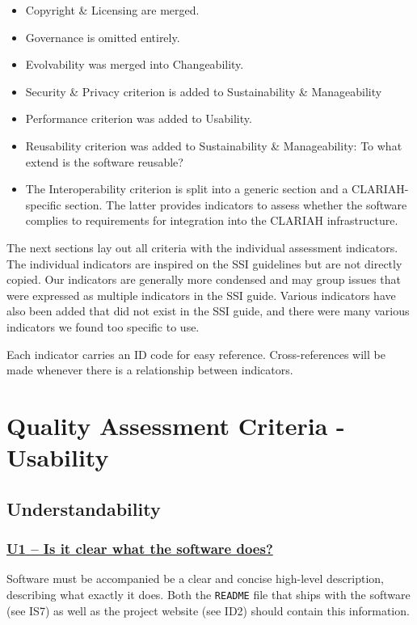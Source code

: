 \documentclass[a4paper,11pt]{article}
\newcommand{\indicator}[1]{\subsubsection*{\underline{#1}}}
\begin{document}
\begin{itemize}
\item Copyright \& Licensing are merged.
\item Governance is omitted entirely. %
\item Evolvability was merged into Changeability.
\item Security \& Privacy criterion is added to Sustainability \& Manageability
\item Performance criterion was added to Usability.
\item Reusability criterion was added to Sustainability \& Manageability: To what extend is the software reusable?
\item The Interoperability criterion is split into a generic section and a CLARIAH-specific section. The latter provides indicators to assess
whether the software complies to requirements for integration into the CLARIAH infrastructure.
\end{itemize}

The next sections lay out all criteria with the individual assessment
indicators. The individual indicators are inspired on the SSI guidelines but
are not directly copied. Our indicators are generally more condensed and may
group issues that were expressed as multiple indicators in the SSI guide.
Various indicators have also been added that did not exist in the SSI guide,
and there were many various indicators we found too specific to use.

Each indicator carries an ID code for easy reference. Cross-references will be
made whenever there is a relationship between indicators.

\section{Quality Assessment Criteria - Usability}

\subsection{Understandability}

\indicator{U1 -- Is it clear what the software does?}

Software must be accompanied be a clear and concise high-level description,
describing what exactly it does. Both the \texttt{README} file that ships with
the software (see IS7) as well as the project website (see ID2) should contain
this information. 
\end{document}
